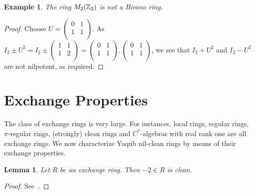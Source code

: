 \documentclass[12pt, reqno]{amsart}
\newtheorem{lem}[thm]{Lemma}
\newtheorem{exam}[thm]{Example}
\numberwithin{equation}{section}
\begin{document}
\begin{exam} The ring $M_2({\Bbb Z}_2)$ is not a Hirano ring.\end{exam}
\begin{proof} Choose $U=\left(
\begin{array}{cc}
0&1\\
1&1\\
\end{array}
\right)$. As $I_2\pm U^2=I_2\pm \left(
\begin{array}{cc}
1&1\\
1&2\\
\end{array}
\right)=\left(
\begin{array}{cc}
0&1\\
1&1\\
\end{array}
\right), \left(
\begin{array}{cc}
0&1\\
1&1\\
\end{array}
\right)$, we see that $I_2+U^2$ and $I_2-U^2$ are not nilpotent, as required.\end{proof}


\section{Exchange Properties}

The class of exchange rings is very large. For instances, local rings, regular rings, $\pi$-regular rings, (strongly) clean rings and $C^*$-algebras with real rank one are all exchange rings. We now characterize Yaqub nil-clean rings by means of their exchange properties.

\begin{lem} Let $R$ be an exchange ring. Then $-2\in R$ is clean.\end{lem}
\begin{proof} See~\cite[Lemma 4.2]{CS2}.\end{proof}
\end{document}
